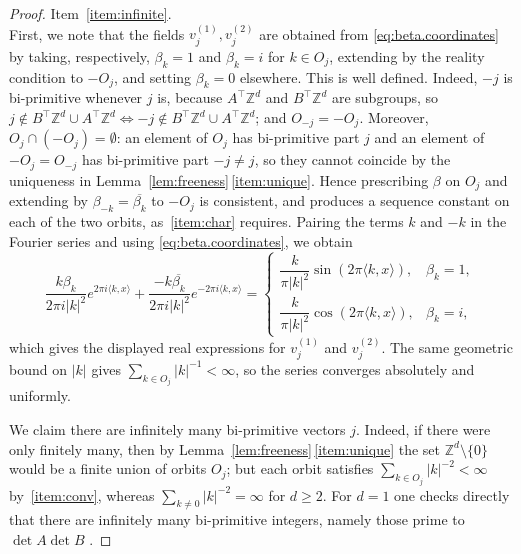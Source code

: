 \documentclass[11pt,reqno]{amsart}
\theoremstyle{plain}
\theoremstyle{definition}
\newcommand{\Z}{\mathbb{Z}}
\begin{document}
\begin{proof}
    \medskip
    \noindent Item~\ref{item:infinite}.\\
    First, we note that the fields \( v_j^{(1)},v_j^{(2)} \) are obtained from \eqref{eq:beta.coordinates} by taking, respectively, \( \beta_k=1 \) and \( \beta_k=i \) for \( k\in O_j \), extending by the reality condition to \( -O_j \), and setting \( \beta_k=0 \) elsewhere.
    This is well defined.
    Indeed, \( -j \) is bi-primitive whenever \( j \) is, because \( A^{\top}\Z^d \) and \(B^{\top}\Z^d \) are subgroups, so \( j\notin B^{\top}\Z^d\cup A^{\top}\Z^d \iff -j\notin B^{\top}\Z^d\cup A^{\top}\Z^d \); and \( O_{-j}=-O_j \).
    Moreover, \( O_j\cap(-O_j)=\emptyset \): an element of \( O_j \) has bi-primitive part \( j \) and an element of \( -O_j=O_{-j} \) has bi-primitive part \( -j\ne j \), so they cannot coincide by the uniqueness in Lemma~\ref{lem:freeness}\,\ref{item:unique}.
    Hence prescribing \( \beta \) on \( O_j \) and extending by \( \beta_{-k}=\overline{\beta_k} \) to \( -O_j \) is consistent, and produces a sequence constant on each of the two orbits, as~\ref{item:char} requires.
    Pairing the terms \( k \) and \( -k \) in the Fourier series and using \eqref{eq:beta.coordinates}, we obtain
    \[
        \frac{k\beta_k}{2\pi i\lvert k \rvert^{2}}e^{2\pi i\langle k,x\rangle}
        +\frac{-k\overline{\beta_k}}{2\pi i\lvert k \rvert^{2}}e^{-2\pi i\langle k,x\rangle}
        =\begin{cases}
            \dfrac{k}{\pi\lvert k \rvert^{2}}\sin\left(2\pi\langle k,x\rangle\right), & \beta_k=1, \\[2mm]
            \dfrac{k}{\pi\lvert k \rvert^{2}}\cos\left(2\pi\langle k,x\rangle\right), & \beta_k=i,
        \end{cases}
    \]
    which gives the displayed real expressions for \( v_j^{(1)} \) and \( v_j^{(2)} \).
    The same geometric bound on \(\lvert k \rvert\) gives \(\sum_{k\in O_j}\lvert k \rvert^{-1}<\infty\), so the series converges absolutely and uniformly.

    We claim there are infinitely many bi-primitive vectors \(j\).
    Indeed, if there were only finitely many, then by Lemma~\ref{lem:freeness}\,\ref{item:unique} the set \( \Z^d\setminus\{0\} \) would be
    a finite union of orbits \( O_j \); but each orbit satisfies \( \sum_{k\in O_j}\lvert k \rvert^{-2}<\infty \) by~\ref{item:conv}, whereas \( \sum_{k\neq0}\lvert k \rvert^{-2}=\infty \) for \( d\ge2 \).
    For \( d=1 \) one checks directly that there are infinitely many bi-primitive integers, namely those
    prime to \( \det A\det B \) \cite[\S7]{kloeckner_optimal_2013_preprint}.


\end{proof}
\end{document}
